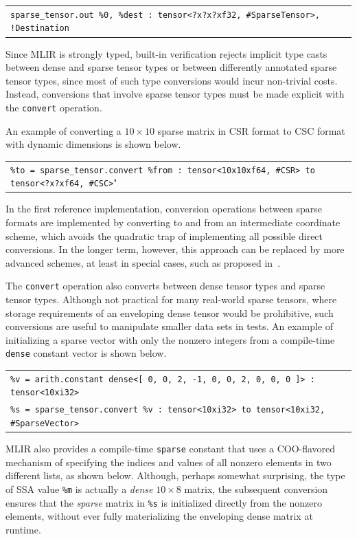 \documentclass[10pt]{article}
\newcommand{\exam}{\begin{flushleft}\scriptsize\begin{tabular}{l}}
\newcommand{\maxe}{\end{tabular}\end{flushleft}}
\begin{document}
\exam
\verb"sparse_tensor.out %0, %dest : tensor<?x?x?xf32, #SparseTensor>, !Destination" \\
\maxe

Since MLIR is strongly typed, built-in verification rejects implicit type casts between dense and sparse tensor types or between differently annotated sparse tensor types, since most of such type conversions would incur non-trivial costs. Instead, conversions that involve sparse tensor types must be made explicit with the \texttt{convert} operation.

An example of converting a $10 \times 10$ sparse matrix in CSR format to CSC format with dynamic dimensions is shown below.

\exam
\verb"%to = sparse_tensor.convert %from : tensor<10x10xf64, #CSR> to tensor<?x?xf64, #CSC>"
\maxe

In the first reference implementation, conversion operations between sparse formats are implemented by converting to and from an intermediate coordinate scheme, which avoids the quadratic trap of implementing all possible direct conversions. In the longer term, however, this approach can be replaced by more advanced schemes, at least in special cases, such as proposed in~\cite{chou2020}.

The \texttt{convert} operation also converts between dense tensor types and sparse tensor types. Although not practical for many real-world sparse tensors, where storage requirements of an enveloping dense tensor would be prohibitive, such conversions are useful to manipulate smaller data sets in tests. An example of initializing a sparse vector with only the nonzero integers from a compile-time \texttt{dense} constant vector is shown below.

\exam
\verb"%v = arith.constant dense<[ 0, 0, 2, -1, 0, 0, 2, 0, 0, 0 ]> : tensor<10xi32>" \\
\verb"%s = sparse_tensor.convert %v : tensor<10xi32> to tensor<10xi32, #SparseVector>" \\
\maxe

MLIR also provides a compile-time \texttt{sparse} constant that uses a COO-flavored mechanism of specifying the indices and values of all nonzero elements in two different lists, as shown below.
Although, perhaps somewhat surprising, the type of SSA value \texttt{\%m} is actually a \emph{dense} $10 \times 8$ matrix, the subsequent conversion ensures that the \emph{sparse} matrix in \texttt{\%s} is initialized directly from the nonzero elements, without ever fully materializing the enveloping dense matrix at runtime.
\end{document}
